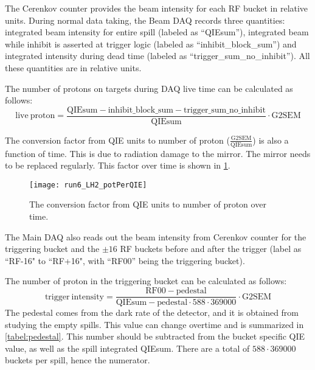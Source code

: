 \documentclass[../main.tex]{subfiles}
\begin{document}
The Cerenkov counter provides the beam intensity for each RF bucket in relative units.
During normal data taking, the Beam DAQ records three quantities: integrated beam intensity for entire spill
(labeled as ``QIEsum''), integrated beam while inhibit is asserted at trigger logic
(labeled as ``inhibit\_block\_sum'') and integrated intensity during dead time (labeled as
``trigger\_sum\_no\_inhibit''). All these quantities are in relative units.

The number of protons on targets during DAQ live time can be calculated as follows:
\begin{equation}
	\mathrm{live\ proton} = \frac{\mathrm{QIEsum}-\mathrm{inhibit\_block\_sum}-\mathrm{trigger\_sum\_no\_inhibit}}{\mathrm{QIEsum}}\cdot \mathrm{G2SEM}
\end{equation}

The conversion factor from QIE units to number of proton ($\frac{\mathrm{G2SEM}}{\mathrm{QIEsum}}$)
is also a function of time. This is due to radiation damage to the mirror. The mirror needs to be replaced
regularly. This factor over time is shown in \cref{fig:potperQIE}.
\begin{figure}
	\centering
	\texttt{[image: run6\_LH2\_potPerQIE]}
	\caption{The conversion factor from QIE units to number of proton over time.}
	\label{fig:potperQIE}
\end{figure}

The Main DAQ also reads out the beam intensity from Cerenkov counter for the triggering bucket
and the $\pm16$ RF buckets before and after the trigger (label as ``RF-16" to ``RF+16", with
``RF00'' being the triggering bucket).

The number of proton in the triggering bucket can be calculated as follows:
\begin{equation}
	\mathrm{trigger\ intensity} = \frac{\mathrm{RF00}-\mathrm{pedestal}}{\mathrm{QIEsum}-\mathrm{pedestal}\cdot 588\cdot 369000}\cdot \mathrm{G2SEM}
\end{equation}
The pedestal comes from the dark rate of the detector, and it is obtained from studying the
empty spills. This value can change overtime and is summarized in \cref{tabel:pedestal}.
This number should be subtracted from the bucket specific QIE value, as well as the spill
integrated QIEsum. There are a total of $588\cdot 369000$ buckets per spill, hence the
numerator.
\end{document}
